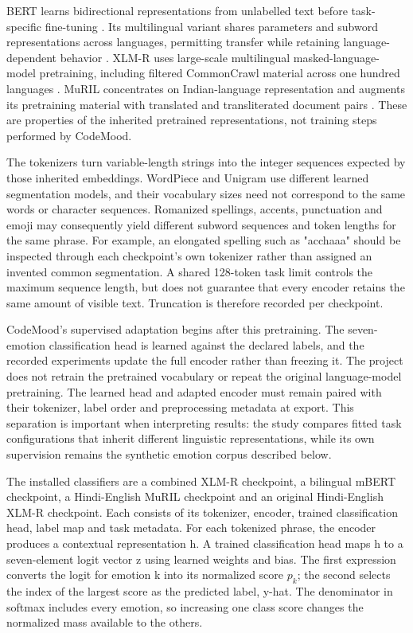 \documentclass[journal]{IEEEtran}
\begin{document}
BERT learns bidirectional representations from unlabelled text before task-specific fine-tuning \cite{devlin2019}. Its multilingual variant shares parameters and subword representations across languages, permitting transfer while retaining language-dependent behavior \cite{pires2019}. XLM-R uses large-scale multilingual masked-language-model pretraining, including filtered CommonCrawl material across one hundred languages \cite{conneau2020}. MuRIL concentrates on Indian-language representation and augments its pretraining material with translated and transliterated document pairs \cite{khanuja2021}. These are properties of the inherited pretrained representations, not training steps performed by CodeMood.

The tokenizers turn variable-length strings into the integer sequences expected by those inherited embeddings. WordPiece and Unigram use different learned segmentation models, and their vocabulary sizes need not correspond to the same words or character sequences. Romanized spellings, accents, punctuation and emoji may consequently yield different subword sequences and token lengths for the same phrase. For example, an elongated spelling such as "acchaaa" should be inspected through each checkpoint's own tokenizer rather than assigned an invented common segmentation. A shared 128-token task limit controls the maximum sequence length, but does not guarantee that every encoder retains the same amount of visible text. Truncation is therefore recorded per checkpoint.

CodeMood's supervised adaptation begins after this pretraining. The seven-emotion classification head is learned against the declared labels, and the recorded experiments update the full encoder rather than freezing it. The project does not retrain the pretrained vocabulary or repeat the original language-model pretraining. The learned head and adapted encoder must remain paired with their tokenizer, label order and preprocessing metadata at export. This separation is important when interpreting results: the study compares fitted task configurations that inherit different linguistic representations, while its own supervision remains the synthetic emotion corpus described below.

The installed classifiers are a combined XLM-R checkpoint, a bilingual mBERT checkpoint, a Hindi-English MuRIL checkpoint and an original Hindi-English XLM-R checkpoint. Each consists of its tokenizer, encoder, trained classification head, label map and task metadata. For each tokenized phrase, the encoder produces a contextual representation h. A trained classification head maps h to a seven-element logit vector z using learned weights and bias. The first expression converts the logit for emotion k into its normalized score \(p_k\); the second selects the index of the largest score as the predicted label, y-hat. The denominator in softmax includes every emotion, so increasing one class score changes the normalized mass available to the others.
\end{document}
